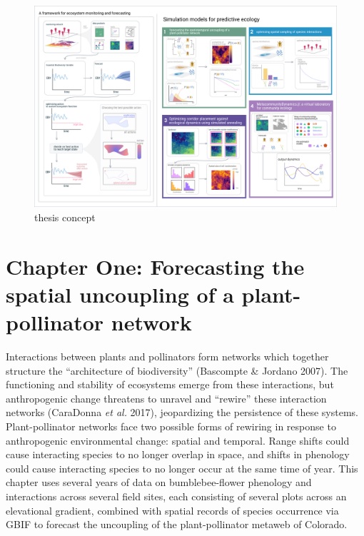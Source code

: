 \documentclass[10pt,oneside]{article}
\makeatletter
\def\maxwidth{\ifdim\Gin@nat@width>\linewidth\linewidth
\else\Gin@nat@width\fi}
\let\Oldincludegraphics\includegraphics
\renewcommand{\includegraphics}[1]{\Oldincludegraphics[width=\maxwidth]{#1}}
\makeatother
\begin{document}
\begin{figure}
\hypertarget{fig:thesis}{%
\centering
\includegraphics{./figures/thesisconcept.png}
\caption{thesis concept}\label{fig:thesis}
}
\end{figure}

\hypertarget{chapter-one-forecasting-the-spatial-uncoupling-of-a-plant-pollinator-network}{%
\section{Chapter One: Forecasting the spatial uncoupling of a
plant-pollinator
network}\label{chapter-one-forecasting-the-spatial-uncoupling-of-a-plant-pollinator-network}}

Interactions between plants and pollinators form networks which together
structure the ``architecture of biodiversity'' (Bascompte \& Jordano
2007). The functioning and stability of ecosystems emerge from these
interactions, but anthropogenic change threatens to unravel and
``rewire'' these interaction networks (CaraDonna \emph{et al.} 2017),
jeopardizing the persistence of these systems. Plant-pollinator networks
face two possible forms of rewiring in response to anthropogenic
environmental change: spatial and temporal. Range shifts could cause
interacting species to no longer overlap in space, and shifts in
phenology could cause interacting species to no longer occur at the same
time of year. This chapter uses several years of data on
bumblebee-flower phenology and interactions across several field sites,
each consisting of several plots across an elevational gradient,
combined with spatial records of species occurrence via GBIF to forecast
the uncoupling of the plant-pollinator metaweb of Colorado.
\end{document}
